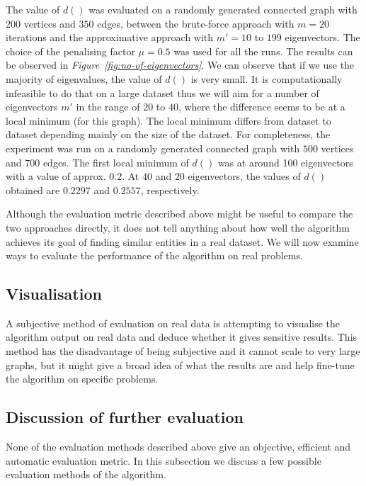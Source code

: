 \documentclass[12pt]{report}
\begin{document}
The value of $d()$ was evaluated on a randomly generated connected graph with $200$
vertices and $350$ edges, between the brute-force approach with $m=20$ iterations
and the approximative approach with $m' = 10$ to $199$ eigenvectors. The choice
of the penalising factor $\mu=0.5$ was used for all the runs. The results can be
observed in \emph{Figure~\ref{fig:no-of-eigenvectors}}. We can observe that if
we use the majority of eigenvalues, the value of $d()$ is very small. It is
computationally infeasible to do that on a large dataset thus we will aim for a
number of eigenvectors $m'$ in the range of $20$ to $40$, where the difference
seems to be at a local minimum (for this graph). The local minimum differs from
dataset to dataset depending mainly on the size of the dataset. For completeness,
the experiment was run on a randomly generated connected graph with $500$ vertices
and $700$ edges. The first local minimum of $d()$ was at around 100 eigenvectors
with a value of approx. $0.2$. At $40$ and $20$ eigenvectors, the values of $d()$
obtained are $0.2297$ and $0.2557$, respectively.


%
%
Although the evaluation metric described above might be useful to compare the two
approaches directly, it does not tell anything about how well the algorithm achieves
its goal of finding similar entities in a real dataset. We will now examine ways to
evaluate the performance of the algorithm on real problems.


%
\subsection*{Visualisation}
%
A subjective method of evaluation on real data is attempting to visualise the
algorithm output on real data and deduce whether it gives sensitive results.
This method has the disadvantage of being subjective and it cannot scale to very
large graphs, but it might give a broad idea of what the results are and help
fine-tune the algorithm on specific problems.


%
\subsection*{Discussion of further evaluation}
%
None of the evaluation methods described above give an objective, efficient and
automatic evaluation metric. In this subsection we discuss a few possible evaluation
methods of the algorithm.
\end{document}
